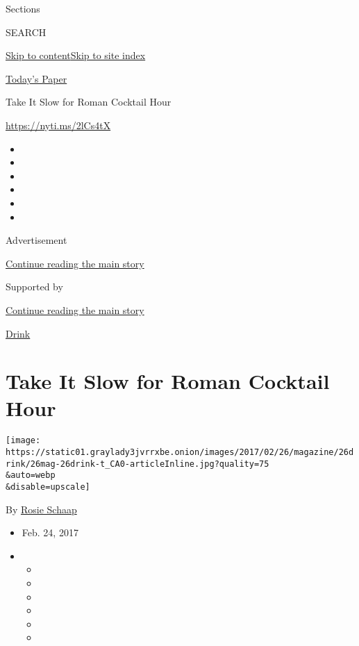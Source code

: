 Sections

SEARCH

\protect\hyperlink{site-content}{Skip to
content}\protect\hyperlink{site-index}{Skip to site index}

\href{https://myaccount.nytimes3xbfgragh.onion/auth/login?response_type=cookie\&client_id=vi}{}

\href{https://www.nytimes3xbfgragh.onion/section/todayspaper}{Today's
Paper}

Take It Slow for Roman Cocktail Hour

\url{https://nyti.ms/2lCs4tX}

\begin{itemize}
\item
\item
\item
\item
\item
\item
\end{itemize}

Advertisement

\protect\hyperlink{after-top}{Continue reading the main story}

Supported by

\protect\hyperlink{after-sponsor}{Continue reading the main story}

\href{/column/magazine-drink}{Drink}

\hypertarget{take-it-slow-for-roman-cocktail-hour}{%
\section{Take It Slow for Roman Cocktail
Hour}\label{take-it-slow-for-roman-cocktail-hour}}

\texttt{[image: https://static01.graylady3jvrrxbe.onion/images/2017/02/26/magazine/26drink/26mag-26drink-t\_CA0-articleInline.jpg?quality=75\\\&auto=webp\\\&disable=upscale]}

By
\href{http://query.nytimes3xbfgragh.onion/search/sitesearch?query=Schaap\%2C+Rosie\&more=date_all}{Rosie
Schaap}

\begin{itemize}
\item
  Feb. 24, 2017
\item
  \begin{itemize}
  \item
  \item
  \item
  \item
  \item
  \item
  \end{itemize}
\end{itemize}

